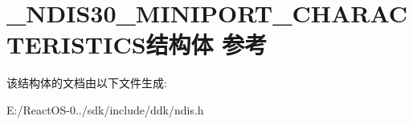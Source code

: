 \hypertarget{struct___n_d_i_s30___m_i_n_i_p_o_r_t___c_h_a_r_a_c_t_e_r_i_s_t_i_c_s}{}\section{\+\_\+\+N\+D\+I\+S30\+\_\+\+M\+I\+N\+I\+P\+O\+R\+T\+\_\+\+C\+H\+A\+R\+A\+C\+T\+E\+R\+I\+S\+T\+I\+C\+S结构体 参考}
\label{struct___n_d_i_s30___m_i_n_i_p_o_r_t___c_h_a_r_a_c_t_e_r_i_s_t_i_c_s}


该结构体的文档由以下文件生成\+:\begin{DoxyCompactItemize}
\item 
E\+:/\+React\+O\+S-\/0../sdk/include/ddk/ndis.\+h\end{DoxyCompactItemize}
